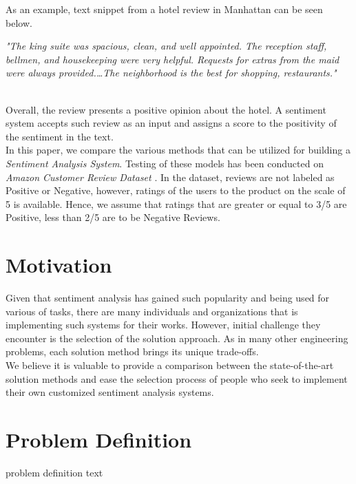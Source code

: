 \documentclass[11pt,a4paper]{article}
\begin{document}
As an example, text snippet from a hotel review in Manhattan can be seen below.\\

\parbox{0.45\textwidth}{
	\centering
	\small
	\textit{
		"The king suite was spacious, clean, and well appointed. The reception staff, bellmen, and housekeeping were very helpful. Requests for extras from the maid were always provided.\ldots The neighborhood is the best for shopping, restaurants." \cite{ronen}
	}
}\\

Overall, the review presents a positive opinion about the hotel. A sentiment system accepts such review as an input and assigns a score to the positivity of the sentiment in the text. \\

In this paper, we compare the various methods that can be utilized for building a \textit{Sentiment Analysis System}. Testing of these models has been conducted on \textit{Amazon Customer Review Dataset} \cite{He_2016, mcauley2015imagebased}. In the dataset, reviews are not labeled as Positive or Negative, however, ratings of the users to the product on the scale of 5 is available. Hence, we assume that ratings that are greater or equal to 3/5 are Positive, less than 2/5 are to be Negative Reviews.

\section{Motivation}
Given that sentiment analysis has gained such popularity and being used for various of tasks, there are many individuals and organizations that is implementing such systems for their works. However, initial challenge they encounter is the selection of the solution approach. As in many other engineering problems, each solution method brings its unique trade-offs. \\

We believe it is valuable to provide a comparison between the state-of-the-art solution methods and ease the selection process of people who seek to implement their own customized sentiment analysis systems. \\



\section{Problem Definition}
problem definition text
\end{document}

